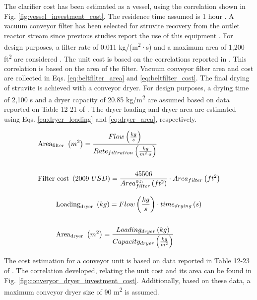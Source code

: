 \documentclass[10pt,a4paper]{article}
\begin{document}
The clarifier cost has been estimated as a vessel, using the correlation shown in Fig. \ref{fig:vessel_investment_cost}. The residence time assumed is 1 hour . A vacuum conveyor filter has been selected for struvite recovery from the outlet reactor stream since previous studies report the use of this equipment . For design purposes, a filter rate of 0.011 kg/(m\textsuperscript{2}·s) and a maximum area of 1,200 ft\textsuperscript{2} are considered . The unit cost is based on the correlations reported in . This correlation is based on the area of the filter. Vacuum conveyor filter area and cost are collected in Eqs. \ref{eq:beltfilter_area} and \ref{eq:beltfilter_cost}. The final drying of struvite is achieved with a conveyor dryer. For design purposes, a drying time of 2,100 s and a dryer capacity of 20.85 kg/m\textsuperscript{2} are assumed based on data reported on Table 12-21 of . The dryer loading and dryer area are estimated using Eqs. \ref{eq:dryer_loading} and \ref{eq:dryer_area}, respectively.

\begin{align} 
& \text{\text{Area}}_{\text{filter}} \ \left(m^{2}\right) = \frac{Flow \left( \frac{kg}{s} \right)}{Rate_{filtration} \left( \frac{kg}{m^{2} \cdot s} \right)} \label{eq:beltfilter_area} \\ \nonumber\\
& \text{Filter cost} \ \left(2009 \ USD\right) = \frac{45506}{Area_{filter}^{0.5} \left( ft^{2} \right)} \cdot Area_{filter} \left( ft^{2} \right) \label{eq:beltfilter_cost}
\end{align}


\begin{align} 
& \text{\text{Loading}}_{\text{dryer}} \ \left(kg\right) = Flow \left( \frac{kg}{s} \right) \cdot time_{drying} \left( s\right) \label{eq:dryer_loading} \\
\nonumber\\
& \text{\text{Area}}_{\text{dryer}} \ \left(m^2\right) = \frac{Loading_{dryer}\left(kg\right)}{Capacity_{dryer} \left(\frac{kg}{m^2}\right)} \label{eq:dryer_area}
\end{align}



The cost estimation for a conveyor unit is based on data reported in Table 12-23 of . The correlation developed, relating the unit cost and its area can be found in Fig. \ref{fig:converyor_dryer_investment_cost}. Additionally, based on these data, a maximum conveyor dryer size of 90 m\textsuperscript{2} is assumed.
\end{document}

